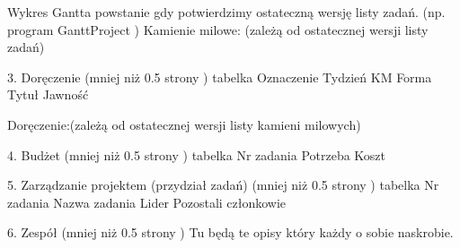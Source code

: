 Wykres Gantta powstanie gdy potwierdzimy ostateczną wersję listy zadań. (np. program GanttProject )
Kamienie milowe: (zależą od ostatecznej wersji listy zadań)
		
3.	Doręczenie (mniej niż 0.5 strony )
    tabelka
    Oznaczenie	Tydzień	KM	Forma	Tytuł	Jawność
	
	
Doręczenie:(zależą od ostatecznej wersji listy kamieni milowych)			

4.	Budżet (mniej niż 0.5 strony )
	tabelka
	Nr zadania	Potrzeba	Koszt			
													
			
5.	Zarządzanie projektem (przydział zadań) (mniej niż 0.5 strony )
	tabelka
	Nr zadania	Nazwa zadania		Lider	Pozostali członkowie
	
	
6.	Zespół (mniej niż 0.5 strony )
	Tu będą te opisy który każdy o sobie naskrobie.
